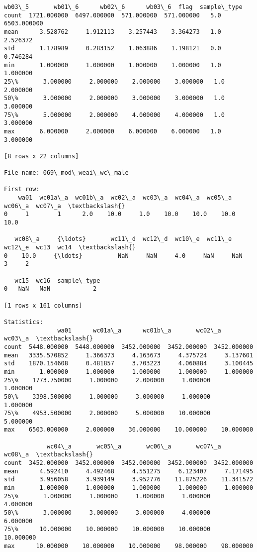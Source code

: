 \documentclass[11pt]{article}
\begin{document}
\begin{Verbatim}[commandchars=\\\{\}]
            wb03\_5       wb01\_6      wb02\_6      wb03\_6  flag  sample\_type  
count  1721.000000  6497.000000  571.000000  571.000000   5.0  6503.000000  
mean      3.528762     1.912113    3.257443    3.364273   1.0     2.526372  
std       1.178989     0.283152    1.063886    1.198121   0.0     0.746284  
min       1.000000     1.000000    1.000000    1.000000   1.0     1.000000  
25\%       3.000000     2.000000    2.000000    3.000000   1.0     2.000000  
50\%       3.000000     2.000000    3.000000    3.000000   1.0     3.000000  
75\%       5.000000     2.000000    4.000000    4.000000   1.0     3.000000  
max       6.000000     2.000000    6.000000    6.000000   1.0     3.000000  

[8 rows x 22 columns]

File name: 069\_mod\_weai\_wc\_male

First row: 
    wa01  wc01a\_a  wc01b\_a  wc02\_a  wc03\_a  wc04\_a  wc05\_a  wc06\_a  wc07\_a  \textbackslash{}
0     1        1      2.0    10.0     1.0    10.0    10.0    10.0    10.0   

   wc08\_a     {\ldots}       wc11\_d  wc12\_d  wc10\_e  wc11\_e  wc12\_e  wc13  wc14  \textbackslash{}
0    10.0     {\ldots}          NaN     NaN     4.0     NaN     NaN     3     2   

   wc15  wc16  sample\_type  
0   NaN   NaN            2  

[1 rows x 161 columns]

Statistics: 
               wa01      wc01a\_a      wc01b\_a       wc02\_a       wc03\_a  \textbackslash{}
count  5448.000000  5448.000000  3452.000000  3452.000000  3452.000000   
mean   3335.570852     1.366373     4.163673     4.375724     3.137601   
std    1870.154608     0.481857     3.703223     4.060884     3.100445   
min       1.000000     1.000000     1.000000     1.000000     1.000000   
25\%    1773.750000     1.000000     2.000000     1.000000     1.000000   
50\%    3398.500000     1.000000     3.000000     1.000000     1.000000   
75\%    4953.500000     2.000000     5.000000    10.000000     5.000000   
max    6503.000000     2.000000    36.000000    10.000000    10.000000   

            wc04\_a       wc05\_a       wc06\_a       wc07\_a       wc08\_a  \textbackslash{}
count  3452.000000  3452.000000  3452.000000  3452.000000  3452.000000   
mean      4.592410     4.492468     4.551275     6.123407     7.171495   
std       3.956058     3.939149     3.952776    11.875226    11.341572   
min       1.000000     1.000000     1.000000     1.000000     1.000000   
25\%       1.000000     1.000000     1.000000     1.000000     4.000000   
50\%       3.000000     3.000000     3.000000     4.000000     6.000000   
75\%      10.000000    10.000000    10.000000    10.000000    10.000000   
max      10.000000    10.000000    10.000000    98.000000    98.000000   


\end{Verbatim}
\end{document}
